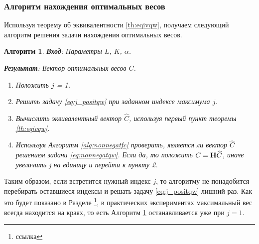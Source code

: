 \documentclass[12pt,a4paper]{article}
\newtheorem{algorithm}{Алгоритм}
\begin{document}
\subsubsection{Алгоритм нахождения оптимальных весов}
Используя теорему об эквивалентности \ref{th:eqivqw}, получаем следующий алгоритм решения задачи нахождения оптимальных весов.
\begin{algorithm}
	\label{alg:solveqw}
	\textbf{Вход}: Параметры $L$, $K$, $\alpha$.
	
	\textbf{Результат}:
	Вектор оптимальных весов $C$.
	
	\begin{enumerate}
		\item Положить $j$ = 1.
		\item Решить задачу \eqref{eq:j_positqw} при заданном индексе максимума $j$.
		\item Вычислить эквивалентный вектор $\widehat C$, используя первый пункт теоремы \ref{th:eqivqw}.
		\item Используя Алгоритм \ref{alg:nonnegatfc} проверить, является ли вектор $\widehat C$ решением задачи \eqref{eq:nonnegatqw}. Если да, то положить $C = \mathbf{H} \widehat C$, иначе увеличить j на единицу и перейти к пункту 2.
	\end{enumerate}
\end{algorithm}

Таким образом, если встретится нужный индекс $j$, то алгоритму не понадобится перебирать оставшиеся индексы и решать задачу \eqref{eq:j_positqw} лишний раз. Как это будет показано в Разделе \footnote{ссылка}, в практических экспериментах максимальный вес всегда находится на краях, то есть Алгоритм \ref{alg:solveqw} останавливается уже при $j = 1$.
\end{document}
